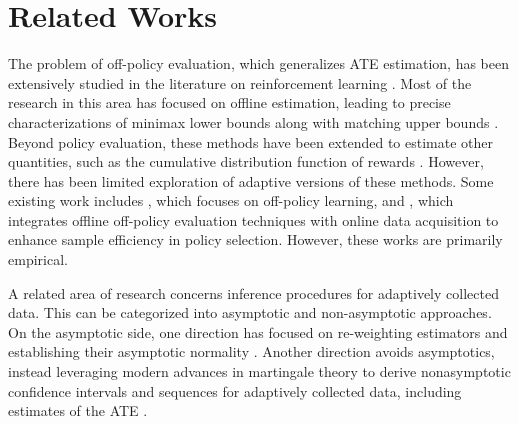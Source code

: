 \section{Related Works}
The problem of off-policy evaluation, which generalizes ATE estimation, has been extensively studied in the literature on reinforcement learning \citep{Dudik2011Doubly, Li2011Unbiased, Jiang2016DoublyRO}. 
Most of the research in this area has focused on offline estimation, leading to precise characterizations of minimax lower bounds along with matching upper bounds \citep{Li2015Toward, Wang2017OptimalAA, Duan2020Minimax, Ma2021MinimaxOE}. Beyond policy evaluation, these methods have been extended to estimate other quantities, such as the cumulative distribution function of rewards \citep{Huang2021OffCB, Huang2022OffRL}. 
However, there has been limited exploration of adaptive versions of these methods. 
Some existing work includes \citet{Hanna2017DataEfficientPE}, which focuses on off-policy learning, and \citet{Konyushova2021Active}, which integrates offline off-policy evaluation techniques with online data acquisition to enhance sample efficiency in policy selection. 
However, these works are primarily empirical.

A related area of research concerns inference procedures for adaptively collected data. This  can be categorized into asymptotic and non-asymptotic approaches. 
On the asymptotic side, one direction has focused on re-weighting estimators and establishing their asymptotic normality \citep{Hadad2021Confidence, Zhang2020Inference, Zhang2021Statistical}. 
Another direction avoids asymptotics, instead leveraging modern advances in martingale theory to derive nonasymptotic confidence intervals and sequences for adaptively collected data, including estimates of the ATE \citep{Howard2018TimeUniform, Waudby2023Estimating, WaudbySmith2022AnytimevalidOI}.